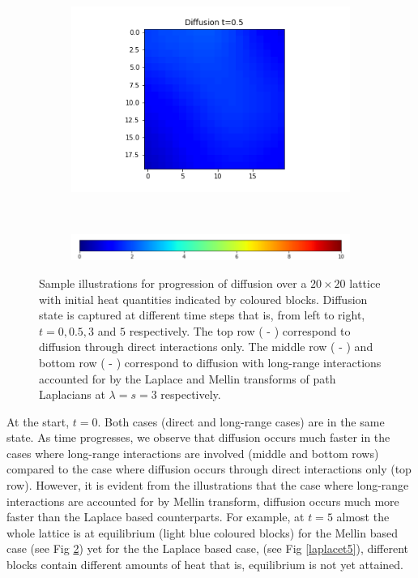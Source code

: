 \documentclass[10pt,a4paper]{article}
\begin{document}
\begin{figure}[!h]
\begin{subfigure}[b]{0.25\textwidth}
    		\caption{}
    		\label{mellint3}
    	\end{subfigure}~
    	\begin{subfigure}[b]{0.25\textwidth}
    		\includegraphics[width= \textwidth]{images/mellin-x3-t5.png}
    		\caption{}
    		\label{mellint5}
    	\end{subfigure} \\
        \begin{subfigure}[b]{0.45\textwidth}
        \includegraphics[width= \textwidth]{images/colour-bar-grid.png}
        \end{subfigure}
    		\caption{Sample illustrations for progression of diffusion over a $20 \times 20$ lattice with initial heat quantities indicated by coloured blocks. Diffusion state is captured at different time steps that is, from left to right, $t= 0, 0.5, 3$ and $5$ respectively. The top row ( - ) correspond to diffusion through direct interactions only. The middle row ( - ) and bottom row ( - ) correspond to diffusion with long-range interactions accounted for by the Laplace and Mellin transforms of path Laplacians at $\lambda = s=3$ respectively. }
    		\label{gridx0}
    	\end{figure}
    	
    	At the start, $t=0$. Both cases (direct and long-range cases) are in the same state. As time progresses, we observe that diffusion occurs much faster in the cases where long-range interactions are involved (middle and bottom rows) compared to the case where diffusion occurs through direct interactions only (top row). However, it is evident from the illustrations that the case where long-range interactions are accounted for by Mellin transform, diffusion occurs much more faster than the Laplace based counterparts. For example, at $t=5$ almost the whole lattice is at equilibrium (light blue coloured blocks) for the Mellin based case (see Fig \ref{mellint5}) yet for the the Laplace based case, (see Fig \ref{laplacet5}), different blocks contain different amounts of heat that is, equilibrium is not yet attained.
   	
\end{document}
